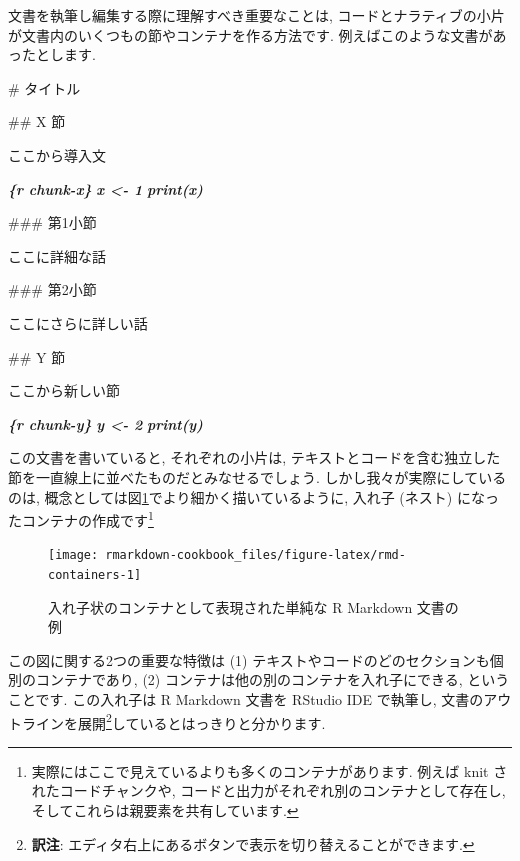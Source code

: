 \documentclass[
  11pt,
  lualatex,ja=standard,jafont=noto]{bxjsreport}
\newenvironment{Shaded}{\begin{snugshade}}{\end{snugshade}}
\newcommand{\FunctionTok}[1]{\textcolor[rgb]{0.00,0.00,0.00}{#1}}
\newcommand{\InformationTok}[1]{\textcolor[rgb]{0.56,0.35,0.01}{\textbf{\textit{#1}}}}
\newcommand{\NormalTok}[1]{#1}
\begin{document}
文書を執筆し編集する際に理解すべき重要なことは, コードとナラティブの小片が文書内のいくつもの節やコンテナを作る方法です. 例えばこのような文書があったとします.

\begin{Shaded}
\begin{Highlighting}[]
\FunctionTok{\# タイトル}

\FunctionTok{\#\# X 節}

\NormalTok{ここから導入文}

\InformationTok{\textasciigrave{}\textasciigrave{}\textasciigrave{}\{r chunk{-}x\}}
\InformationTok{x \textless{}{-} 1}
\InformationTok{print(x)}
\InformationTok{\textasciigrave{}\textasciigrave{}\textasciigrave{}}

\FunctionTok{\#\#\# 第1小節}

\NormalTok{ここに詳細な話}

\FunctionTok{\#\#\# 第2小節}

\NormalTok{ここにさらに詳しい話}

\FunctionTok{\#\# Y 節}

\NormalTok{ここから新しい節}

\InformationTok{\textasciigrave{}\textasciigrave{}\textasciigrave{}\{r chunk{-}y\}}
\InformationTok{y \textless{}{-} 2}
\InformationTok{print(y)}
\InformationTok{\textasciigrave{}\textasciigrave{}\textasciigrave{}}
\end{Highlighting}
\end{Shaded}

この文書を書いていると, それぞれの小片は, テキストとコードを含む独立した節を一直線上に並べたものだとみなせるでしょう. しかし我々が実際にしているのは, 概念としては図\ref{fig:rmd-containers}でより細かく描いているように, 入れ子 (ネスト) になったコンテナの作成です\footnote{実際にはここで見えているよりも多くのコンテナがあります. 例えば knit されたコードチャンクや, コードと出力がそれぞれ別のコンテナとして存在し, そしてこれらは親要素を共有しています.}

\begin{figure}

{\centering \texttt{[image: rmarkdown-cookbook\_files/figure-latex/rmd-containers-1]} 

}

\caption{入れ子状のコンテナとして表現された単純な R Markdown 文書の例}\label{fig:rmd-containers}
\end{figure}

この図に関する2つの重要な特徴は (1) テキストやコードのどのセクションも個別のコンテナであり, (2) コンテナは他の別のコンテナを入れ子にできる, ということです. この入れ子は R Markdown 文書を RStudio IDE で執筆し, 文書のアウトラインを展開\footnote{\textbf{訳注}: エディタ右上にあるボタンで表示を切り替えることができます.}しているとはっきりと分かります.
\end{document}
